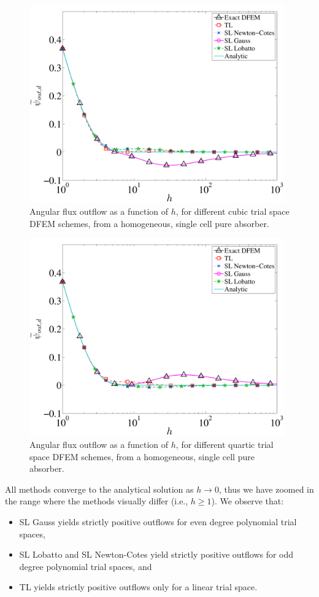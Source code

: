 \begin{figure}[!htp]
\centering
\includegraphics[width=11cm]{chapter2_constant_xs/P3_Outflow_AllMeth-eps-converted-to.pdf}
\caption{Angular flux outflow as a function of $h$, for different cubic trial space DFEM schemes, from a homogeneous, single cell pure absorber.}
\label{fig:p3_outflow}
\end{figure}
\begin{figure}[!hbp]
\centering
\includegraphics[width=11cm]{chapter2_constant_xs/P4_Outflow_AllMeth-eps-converted-to.pdf}
\caption{Angular flux outflow as a function of $h$, for different quartic trial space DFEM schemes, from a homogeneous, single cell pure absorber.}
\label{fig:p4_outflow}
\end{figure}
All methods converge to the analytical solution as $h\to 0$, thus we have zoomed in the range where the methods  visually differ (i.e., $h \ge 1$). 
We observe that:
\begin{itemize}
\item SL Gauss yields strictly positive outflows for even degree polynomial trial spaces,
\item SL Lobatto and SL Newton-Cotes yield strictly positive outflows for odd degree polynomial trial spaces, and
\item TL yields strictly positive outflows only for a linear trial space.
\end{itemize}

